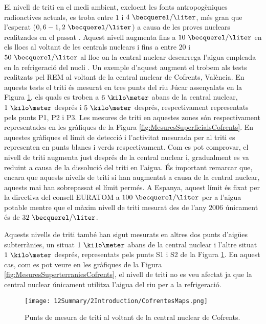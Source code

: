 El nivell de triti en el medi ambient, excloent les fonts antropogèniques radioactives actuals, es troba entre $1$ i $4~\becquerel/\liter$, més gran que l'esperat ($0,6-1,2~\becquerel/\liter$) a causa de les proves nuclears realitzades en el passat \cite{FranceTritiumEnvironment}. Aquest nivell augmenta fins a $10~\becquerel/\liter$ en els llocs al voltant de les centrals nuclears i fins a entre $20$ i $50~\becquerel/\liter$ al lloc on la central nuclear descarrega l'aigua empleada en la refrigeració del nucli \cite{FranceTritiumEnvironment}. Un exemple d'aquest augment el trobem als tests realitzats pel REM al voltant de la central nuclear de Cofrents, València. En aquests tests el triti és mesurat en tres punts del riu Júcar assenyalats en la Figura \ref{fig:PuntsMesuraTritiCofrents}, els quals es troben a $6~\kilo\meter$ abans de la central nuclear, $1~\kilo\meter$ després i $5~\kilo\meter$ després, respectivament representats pels punts P1, P2 i P3. Les mesures de triti en aquestes zones són respectivament representades en les gràfiques de la Figura \ref{fig:MesuresSuperficialsCofrents}. En aquestes gràfiques el límit de detecció i l'activitat mesurada per al triti es representen en punts blancs i verds respectivament. Com es pot comprovar, el nivell de triti augmenta just després de la central nuclear i, gradualment es va reduint a causa de la dissolució del triti en l'aigua. És important remarcar que, encara que aquests nivells de triti si han augmentat a causa de la central nuclear, aquests mai han sobrepassat el límit permés. A Espanya, aquest límit és fixat per la directiva del consell EURATOM a $100~\becquerel/\liter$ per a l'aigua potable \cite{100BqL} mentre que el màxim nivell de triti mesurat des de l'any $2006$ únicament és de $32~\becquerel/\liter$.

Aquests nivells de triti també han sigut mesurats en altres dos punts d'aigües subterrànies, un situat $1~\kilo\meter$ abans de la central nuclear i l'altre situat $1~\kilo\meter$ després, representats pels punts S1 i S2 de la Figura \ref{fig:PuntsMesuraTritiCofrents}. En aquest cas, com es pot veure en les gràfiques de la Figura \ref{fig:MesuresSuperterraniesCofrents}, el nivell de triti no es veu afectat ja que la central nuclear únicament utilitza l'aigua del riu per a la refrigeració.

\begin{figure}[hbtp]
\texttt{[image: 12Summary/2Introduction/CofrentesMaps.png]}
\centering
\caption{Punts de mesura de triti al voltant de la central nuclear de Cofrents.\label{fig:PuntsMesuraTritiCofrents}}
\end{figure}

